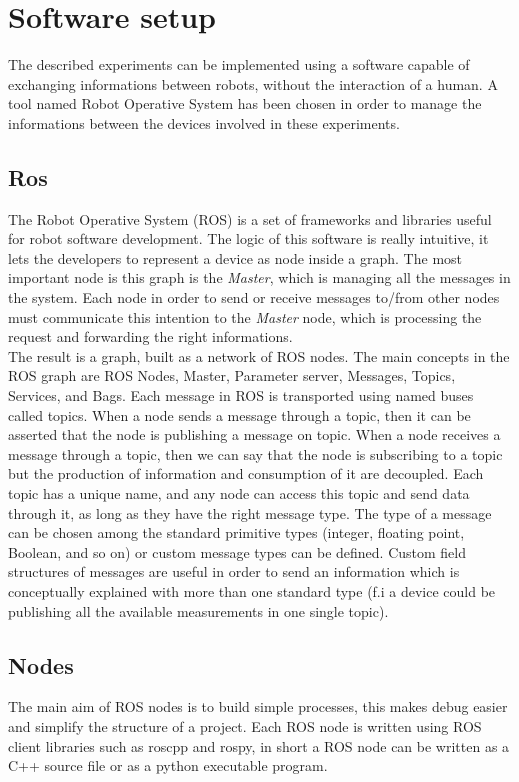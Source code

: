 \chapter{Software setup}
The described experiments can be implemented using a software capable of exchanging informations between robots, without the interaction of a human. A tool named Robot Operative System has been chosen in order to manage the informations between the devices involved in these experiments.  
\section{Ros}
The Robot Operative System (ROS) is a set of frameworks and libraries useful for robot software development. The logic of this software is really intuitive, it lets the developers to represent a device as node inside a graph. The most important node is this graph is the \textit{Master}, which is managing all the messages in the system. Each node in order to send or receive messages to/from other nodes must communicate this intention to the \textit{Master} node, which is processing the request and forwarding the right informations.\\
The result is a graph, built as a network of ROS nodes.
The main concepts in the ROS graph are ROS Nodes, Master, Parameter server, Messages,
Topics, Services, and Bags. 
Each message in ROS is transported using named buses called topics. When a node sends a message through a topic, then it can be asserted that the node is publishing a message on topic. When a node receives a message through a topic,
then we can say that the node is subscribing to a topic but the production of information and consumption of it are decoupled. Each topic has a unique name, and any node can access this topic and send data through it, as long as they have the right message type. The type of a message can be chosen among the standard primitive types (integer, floating point, Boolean, and so on) or custom message types can be defined. Custom field structures of messages are useful in order to send an information which is conceptually explained with more than one standard type (f.i a device could be publishing all the available measurements in one single topic).

\section{Nodes}
The main aim of ROS nodes is to build simple processes, this makes debug easier and simplify the structure of a project. Each ROS node is written using ROS client libraries such as roscpp and rospy, in short a ROS node can be written as a C++ source file or as a python executable program. 

